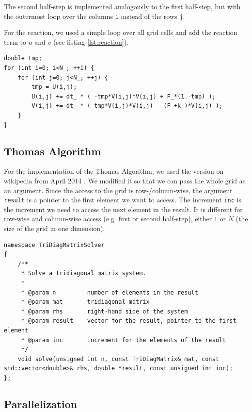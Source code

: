 \documentclass[a4paper]{article}
\begin{document}
The second half-step is implemented analogously to the first half-step, but with the outermost loop over the columns \verb+i+ instead of the rows \verb+j+.

For the reaction, we used a simple loop over all grid cells and add the reaction term to $u$ and $v$ (see listing \ref{lst:reaction}).

\begin{lstlisting}[label={lst:reaction}, caption={Reaction, serial implementaion}]
double tmp;
for (int i=0; i<N_; ++i) {
    for (int j=0; j<N_; ++j) {
        tmp = U(i,j);
        U(i,j) += dt_ * ( -tmp*V(i,j)*V(i,j) + F_*(1.-tmp) );
        V(i,j) += dt_ * ( tmp*V(i,j)*V(i,j) - (F_+k_)*V(i,j) );
    }
}
\end{lstlisting}



\subsection{Thomas Algorithm}\label{sec:thomas}
For the implementation of the Thomas Algorithm, we used the version on wikipedia from April 2014 \cite{wiki:thomas-alg}.
We modified it so that we can pass the whole grid as an argument.
Since the access to the grid is row-/column-wise, the argument \verb+result+ is a pointer to the first element we want to access.
The increment \verb+inc+ is the increment we need to access the next element in the result.
It is different for row-wise and column-wise access (e.g. first or second half-step), either $1$ or $N$ (the size of the grid in one dimension).

\begin{lstlisting}[label={lst:thomas-dec}, caption={Declaration of our implementation of the Thomas algorithm}, float]
namespace TriDiagMatrixSolver
{
    /**
     * Solve a tridiagonal matrix system.
     * 
     * @param n         number of elements in the result
     * @param mat       tridiagonal matrix
     * @param rhs       right-hand side of the system
     * @param result    vector for the result, pointer to the first element
     * @param inc       increment for the elements of the result
     */
    void solve(unsigned int n, const TriDiagMatrix& mat, const std::vector<double>& rhs, double *result, const unsigned int inc);
};
\end{lstlisting}


\subsection{Parallelization}
\end{document}
